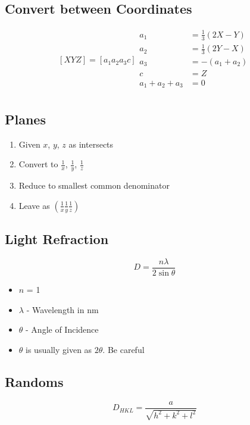 	\subsection{Convert between Coordinates}
		\begin{equation}
			\left[ XYZ \right] = \left[ a_{1} a_{2} a_{3} c \right]
			\begin{aligned}
				a_{1} &= \frac{1}{3} \left( 2X - Y \right) \\
				a_{2} &= \frac{1}{3} \left( 2Y - X \right) \\
				a_{3} &= - \left( a_{1} + a_{2} \right) \\
				c &= Z \\
				a_{1} + a_{2} + a_{3} &= 0 \\
			\end{aligned}
		\end{equation}
	
	\subsection{Planes}
		\begin{enumerate}[noitemsep]
			\item Given $x$, $y$, $z$ as intersects
			\item Convert to $\frac{1}{x}$, $\frac{1}{y}$, $\frac{1}{z}$
			\item Reduce to smallest common denominator
			\item Leave as $\left( \frac{1}{x} \frac{1}{y} \frac{1}{z} \right)$
		\end{enumerate}
	
	\subsection{Light Refraction}
		\begin{equation}
			D = \frac{n \lambda}{2 \sin \theta}
		\end{equation}
		\begin{itemize}[noitemsep]
			\item $n$ = 1
			\item $\lambda$ - Wavelength in \si{\nano \meter}
			\item $\theta$ - Angle of Incidence
			\item $\theta$ is usually given as $2 \theta$. Be careful
		\end{itemize}
	
	\subsection{Randoms}
		\begin{equation}
			D_{HKL} = \frac{a}{\sqrt{h^{2}+k^{2}+l^{2}}}
		\end{equation}		